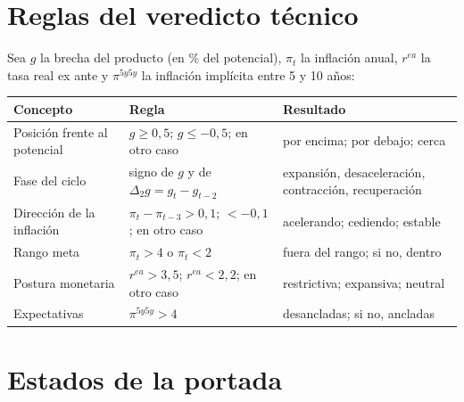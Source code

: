 \section{Reglas del veredicto técnico}

Sea $g$ la brecha del producto (en \% del potencial), $\pi_t$ la inflación anual, $r^{ea}$ la tasa real ex ante y
$\pi^{5y5y}$ la inflación implícita entre 5 y 10 años:

\begin{center}
\small
\begin{tabularx}{\linewidth}{>{\raggedright\arraybackslash}p{3.4cm}X>{\raggedright\arraybackslash}p{4cm}}
\toprule
\textbf{Concepto} & \textbf{Regla} & \textbf{Resultado}\\
\midrule
Posición frente al potencial & $g\ge 0{,}5$; $g\le-0{,}5$; en otro caso & por encima; por debajo; cerca\\
Fase del ciclo & signo de $g$ y de $\Delta_2 g = g_t-g_{t-2}$ & expansión, desaceleración, contracción, recuperación\\
Dirección de la inflación & $\pi_t-\pi_{t-3}>0{,}1$; $<-0{,}1$; en otro caso & acelerando; cediendo; estable\\
Rango meta & $\pi_t>4$ o $\pi_t<2$ & fuera del rango; si no, dentro\\
Postura monetaria & $r^{ea}>3{,}5$; $r^{ea}<2{,}2$; en otro caso & restrictiva; expansiva; neutral\\
Expectativas & $\pi^{5y5y}>4$ & desancladas; si no, ancladas\\
\bottomrule
\end{tabularx}
\end{center}

\section{Estados de la portada}

